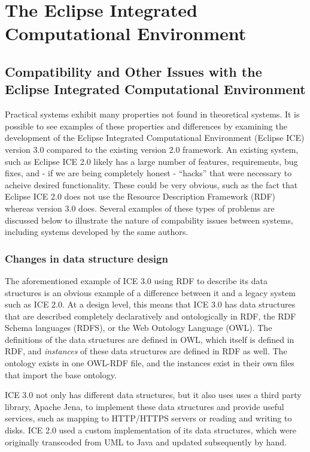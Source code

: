 \chapter{The Eclipse Integrated Computational Environment} \label{ch:eclipse-ice}

\section{Compatibility and Other Issues with the Eclipse Integrated Computational Environment}

Practical systems exhibit many properties not found in theoretical systems. It is possible to see examples of these properties and differences by examining the development of the Eclipse Integrated Computational Environment (Eclipse ICE) version 3.0 compared to the existing version 2.0 framework. An existing system, such as Eclipse ICE 2.0 likely has a large number of features, requirements, bug fixes, and - if we are being completely honest - ``hacks'' that were necessary to acheive desired functionality. These could be very obvious, such as the fact that Eclipse ICE 2.0 does not use the Resource Description Framework (RDF) whereas version 3.0 does. Several examples of these types of problems are discussed below to illustrate the nature of compability issues between systems, including systems developed by the same authors.

\subsection{Changes in data structure design}

The aforementioned example of ICE 3.0 using RDF to describe its data structures is an obvious example of a difference between it and a legacy system such as ICE 2.0. At a design level, this means that ICE 3.0 has data structures that are described completely declaratively and ontologically in RDF, the RDF Schema languages (RDFS), or the Web Ontology Language (OWL). The definitions of the data structures are defined in OWL, which itself is defined in RDF, and \textit{instances} of these data structures are defined in RDF as well. The ontology exists in one OWL-RDF file, and the instances exist in their own files that import the base ontology. 

ICE 3.0 not only has different data structures, but it also uses uses a third party library, Apache Jena, to implement these data structures and provide useful services, such as mapping to HTTP/HTTPS servers or reading and writing to disks. ICE 2.0 used a custom implementation of its data structures, which were originally transcoded from UML to Java and updated subsequently by hand. 

